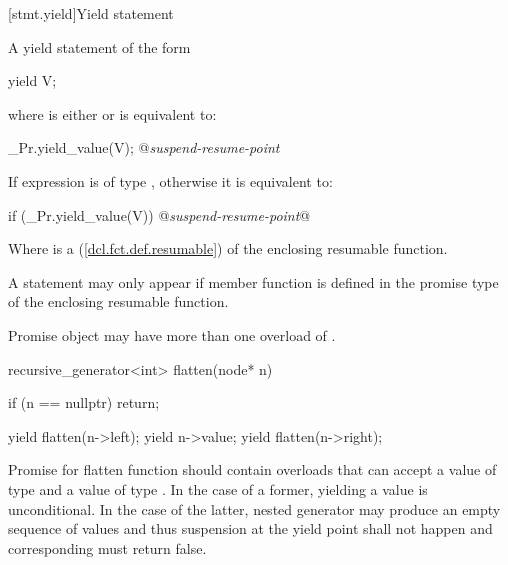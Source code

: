 %

[stmt.yield]{Yield statement}%

\pnum
A yield statement of the form

\begin{codeblock}
  yield V;
\end{codeblock}

where  is either  or  is equivalent to:

\begin{codeblock}
  _Pr.yield_value(V);
  @\textit{suspend-resume-point}
\end{codeblock}

If  expression is of type , otherwise it is equivalent to:

\begin{codeblock}
  if (_Pr.yield_value(V)) {
    @\textit{suspend-resume-point}@
  }
\end{codeblock}

Where  is a  (\ref{dcl.fct.def.resumable}) of the enclosing resumable function.

\pnum
A  statement may only appear if  member
function is defined in the promise type of the enclosing resumable function.

\pnum
Promise object may have more than one overload of .

\enterexample
\begin{codeblock}
  recursive_generator<int> flatten(node* n)
  {
    if (n == nullptr)
      return;
    
    yield flatten(n->left);
    yield n->value;
    yield flatten(n->right);
  }
\end{codeblock}

Promise for flatten function should contain overloads that can accept a value of type  and a value of type .
In the case of a former, yielding a value is unconditional. In the case of the latter, nested generator may produce an empty sequence of values and thus suspension at the yield point shall not happen and corresponding  must return false. 
\exitexample
